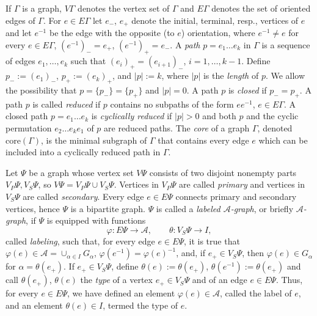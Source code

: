 \documentclass[10pt, reqno]{amsart}
\numberwithin{equation}{section}
\begin{document}
If $\Gamma$ is a graph, $V \Gamma $ denotes the vertex set of  $\Gamma $ and  $E \Gamma $ denotes the  set of oriented edges of $\Gamma$. For $e \in E \Gamma $ let  $e_-$, $e_+$ denote the initial, terminal, resp., vertices of  $e$ and let $e^{-1}$ be the edge with the opposite (to $e$) orientation, where $e^{-1} \ne  e$ for every $e \in E\Gamma$,  $(e^{-1})_- = e_+$, $(e^{-1})_+ = e_-$.
A  {\em path} $p = e_1 \dots e_k$ in $\Gamma$ is a sequence of edges $e_1, \dots, e_k$ such that $(e_{i})_+ = (e_{i+1})_-$,  $i=1, \dots, k-1$.
Define $p_- := (e_1)_-$, $p_+ := (e_k)_+$, and $|p| := k$, where $|p| $ is the {\em length} of $p$. We  allow
the possibility  that $p = \{ p_- \} = \{ p_+ \}$ and $|p| = 0$. A path $p$ is {\em closed} if $p_- =p_+$.
A path $p  $ is called {\em reduced} if  $p$ contains no subpaths of the form $e e^{-1}$, $e \in E\Gamma$.
A closed path $p = e_1 \dots e_k$  is {\em cyclically reduced} if $|p| >0$ and both $p$ and the cyclic permutation
$e_2 \dots e_k e_1$ of $p$ are reduced paths. The  {\em core} of a graph $\Gamma$,  denoted  $\mbox{core}(\Gamma)$,
is the minimal subgraph of $\Gamma$ that contains every  edge $e$ which
can be included into a cyclically reduced path in $\Gamma$.

Let $\Psi$ be a  graph whose vertex set  $V \Psi$  consists of two disjoint nonempty parts  $V_P \Psi,  V_S \Psi$, so $V \Psi = V_P \Psi \cup V_S \Psi$. Vertices in  $ V_P \Psi$ are called {\em primary} and vertices in  $ V_S \Psi$ are called {\em secondary}.
Every edge $e \in E \Psi$ connects  primary and secondary vertices, hence $\Psi$ is a bipartite graph.   $\Psi$ is called a  {\em labeled ${\mathcal{A}}$-graph}, or briefly {\em ${\mathcal{A}}$-graph},  if  $\Psi$ is equipped with functions
 \begin{equation*}
{\varphi} : E\Psi \to {\mathcal{A}} , \qquad {\theta} :  V_S \Psi \to I ,
\end{equation*}
called  {\em labeling}, such that, for every edge $e \in E\Psi$, it is true that
${\varphi}(e) \in {\mathcal{A}} = \cup_{{\alpha} \in I} G_{\alpha}$, ${\varphi}(e^{-1}) =  {\varphi}(e)^{-1}$,   and,  if
$e_+ \in V_S \Psi$, then ${\varphi}(e) \in G_{\alpha}$ for ${\alpha} = {\theta}(e_+)$. If  $e_+ \in V_S \Psi$, define
${\theta}(e) :={\theta}(e_+)$,   ${\theta}(e^{-1}) :={\theta}(e_+)$ and call ${\theta}(e_+)$, ${\theta}(e) $    the {\em type} of  a vertex $e_+ \in V_S \Psi$ and of an edge $e \in E\Psi$. Thus, for every   $e \in E\Psi$, we have defined  an element
${\varphi}(e) \in {\mathcal{A}}$,  called the { label} of $e$, and an element ${\theta}(e)   \in I$, termed the type of $e$.
\end{document}
